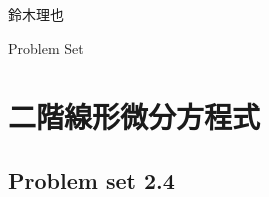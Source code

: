 \documentclass[uplatex]{jsarticle}
\begin{document}
\begin{flushright}
  鈴木理也
\end{flushright}

\setcounter{section}{1}
Problem Set 
\section{二階線形微分方程式}

\subsection{Problem set 2.4}
\end{document}
